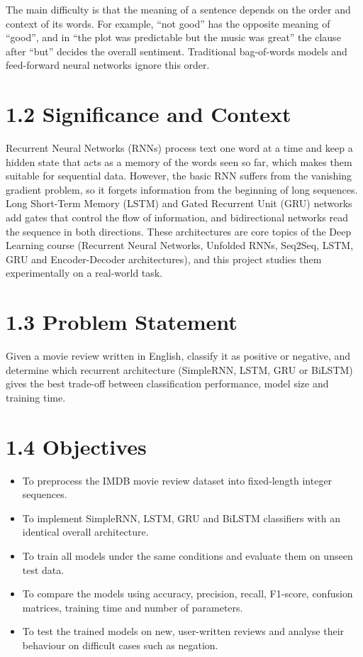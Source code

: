 \documentclass[12pt,a4paper,oneside]{report}
\begin{document}
The main difficulty is that the meaning of a sentence depends on the order and context of its words. For example, ``not good'' has the opposite meaning of ``good'', and in ``the plot was predictable but the music was great'' the clause after ``but'' decides the overall sentiment. Traditional bag-of-words models and feed-forward neural networks ignore this order.

\section*{1.2 Significance and Context}
Recurrent Neural Networks (RNNs) process text one word at a time and keep a hidden state that acts as a memory of the words seen so far, which makes them suitable for sequential data. However, the basic RNN suffers from the vanishing gradient problem, so it forgets information from the beginning of long sequences. Long Short-Term Memory (LSTM) and Gated Recurrent Unit (GRU) networks add gates that control the flow of information, and bidirectional networks read the sequence in both directions. These architectures are core topics of the Deep Learning course (Recurrent Neural Networks, Unfolded RNNs, Seq2Seq, LSTM, GRU and Encoder-Decoder architectures), and this project studies them experimentally on a real-world task.

\section*{1.3 Problem Statement}
Given a movie review written in English, classify it as positive or negative, and determine which recurrent architecture (SimpleRNN, LSTM, GRU or BiLSTM) gives the best trade-off between classification performance, model size and training time.

\section*{1.4 Objectives}
\begin{itemize}
\item To preprocess the IMDB movie review dataset into fixed-length integer sequences.
\item To implement SimpleRNN, LSTM, GRU and BiLSTM classifiers with an identical overall architecture.
\item To train all models under the same conditions and evaluate them on unseen test data.
\item To compare the models using accuracy, precision, recall, F1-score, confusion matrices, training time and number of parameters.
\item To test the trained models on new, user-written reviews and analyse their behaviour on difficult cases such as negation.
\end{itemize}
\end{document}

